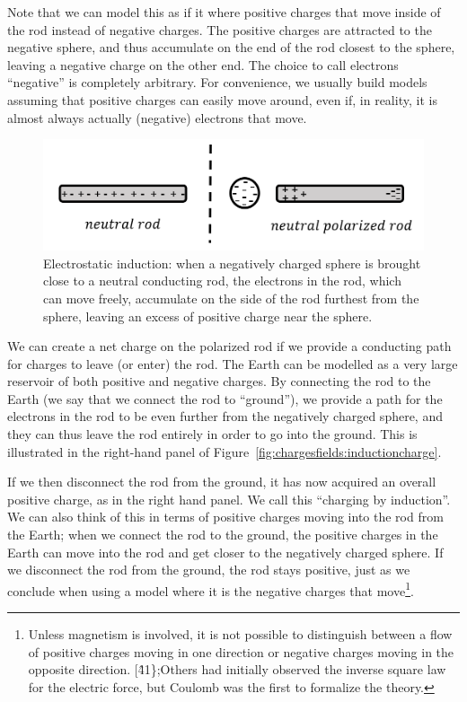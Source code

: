 Note that we can model this as if it where positive charges that move inside of the rod instead of negative charges. The positive charges are attracted to the negative sphere, and thus accumulate on the end of the rod closest to the sphere, leaving a negative charge on the other end. The choice to call electrons ``negative'' is completely arbitrary. For convenience, we usually build models assuming that positive charges can easily move around, even if, in reality, it is almost always actually (negative) electrons that move.

\begin{figure}[!htbp]
\centering
\includegraphics[width=0.9\linewidth]{files/induction-61f57859342bff8910b8621b0315b66b.png}
\caption[]{Electrostatic induction: when a negatively charged sphere is brought close to a neutral conducting rod, the electrons in the rod, which can move freely, accumulate on the side of the rod furthest from the sphere, leaving an excess of positive charge near the sphere.}
\label{fig:chargesfields:induction}
\end{figure}

We can create a net charge on the polarized rod if we provide a conducting path for charges to leave (or enter) the rod. The Earth can be modelled as a very large reservoir of both positive and negative charges. By connecting the rod to the Earth (we say that we connect the rod to ``ground''), we provide a path for the electrons in the rod to be even further from the negatively charged sphere, and they can thus leave the rod entirely in order to go into the ground. This is illustrated in the right-hand panel of Figure~\ref{fig:chargesfields:inductioncharge}.

If we then disconnect the rod from the ground, it has now acquired an overall positive charge, as in the right hand panel. We call this ``charging by induction''. We can also think of this in terms of positive charges moving into the rod from the Earth; when we connect the rod to the ground, the positive charges in the Earth can move into the rod and get closer to the negatively charged sphere. If we disconnect the rod from the ground, the rod stays positive, just as we conclude when using a model where it is the negative charges that move\footnote{Unless magnetism is involved, it is not possible to distinguish between a flow of positive charges moving in one direction or negative charges moving in the opposite direction.
[\^41\};Others had initially observed the inverse square law for the electric force, but Coulomb was the first to formalize the theory.}.

